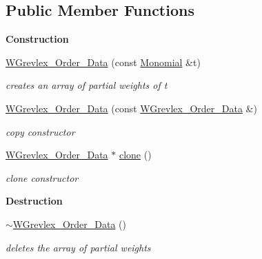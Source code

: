 \subsection*{Public Member Functions}
\begin{Indent}\textbf{ Construction}\par
\begin{DoxyCompactItemize}
\item 
\hyperlink{class_w_grevlex___order___data_a48076dd5a0a5c89e5b1249f760eac8ac}{W\+Grevlex\+\_\+\+Order\+\_\+\+Data} (const \hyperlink{class_monomial}{Monomial} \&t)
\begin{DoxyCompactList}\small\item\em creates an array of partial weights of {\ttfamily t} \end{DoxyCompactList}\item 
\mbox{\label{class_w_grevlex___order___data_a6074df104102f245666d996d100a859c}} 
\hyperlink{class_w_grevlex___order___data_a6074df104102f245666d996d100a859c}{W\+Grevlex\+\_\+\+Order\+\_\+\+Data} (const \hyperlink{class_w_grevlex___order___data}{W\+Grevlex\+\_\+\+Order\+\_\+\+Data} \&)
\begin{DoxyCompactList}\small\item\em copy constructor \end{DoxyCompactList}\item 
\mbox{\label{class_w_grevlex___order___data_a4a3f45d5aabe055a5da7eaad018a206f}} 
\hyperlink{class_w_grevlex___order___data}{W\+Grevlex\+\_\+\+Order\+\_\+\+Data} $\ast$ \hyperlink{class_w_grevlex___order___data_a4a3f45d5aabe055a5da7eaad018a206f}{clone} ()
\begin{DoxyCompactList}\small\item\em clone constructor \end{DoxyCompactList}\end{DoxyCompactItemize}
\end{Indent}
\begin{Indent}\textbf{ Destruction}\par
\begin{DoxyCompactItemize}
\item 
\mbox{\label{class_w_grevlex___order___data_aad8299f5ca80ad008cd62ba9e802abae}} 
\hyperlink{class_w_grevlex___order___data_aad8299f5ca80ad008cd62ba9e802abae}{$\sim$\+W\+Grevlex\+\_\+\+Order\+\_\+\+Data} ()
\begin{DoxyCompactList}\small\item\em deletes the array of partial weights \end{DoxyCompactList}\end{DoxyCompactItemize}
\end{Indent}
